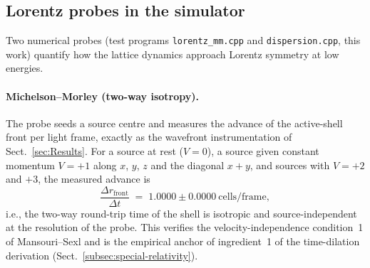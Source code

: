 \documentclass{ijuc}
\begin{document}
\subsection{Lorentz probes in the simulator}\label{subsec:lorentz-probes}
Two numerical probes (test programs \texttt{lorentz\_mm.cpp} and \texttt{dispersion.cpp}, this work) quantify how the lattice dynamics approach Lorentz symmetry at low energies.

\paragraph{Michelson--Morley (two-way isotropy).}  The probe seeds a source centre and measures the advance of the active-shell front per light frame, exactly as the wavefront instrumentation of Sect.~\ref{sec:Results}.  For a source at rest ($V=0$), a source given constant momentum $V=+1$ along $x$, $y$, $z$ and the diagonal $x{+}y$, and sources with $V=+2$ and $+3$, the measured advance is
\begin{equation}
\frac{\Delta r_{\mathrm{front}}}{\Delta t} \;=\; 1.0000 \pm 0.0000 \ \mathrm{cells/frame},
\label{eq:mm-front}
\end{equation}
i.e., the two-way round-trip time of the shell is isotropic and source-independent at the resolution of the probe.  This verifies the velocity-independence condition~1 of Mansouri--Sexl \cite{mansouri-sexl} and is the empirical anchor of ingredient~1 of the time-dilation derivation (Sect.~\ref{subsec:special-relativity}).
\end{document}
